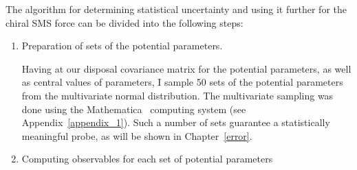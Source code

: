 The algorithm for determining statistical uncertainty and using it further for the chiral SMS force can be divided into the following steps:
\begin{enumerate}
\item Preparation of sets of the potential parameters.

Having at our disposal covariance matrix for the potential parameters, as well as central values of parameters, I sample 50 sets of the potential parameters from the multivariate normal distribution. The multivariate sampling was done using the Mathematica\textsuperscript{\textregistered}~\cite{Mathematica11p3} computing system (see Appendix~\ref{appendix_1}). Such a number of sets guarantee a statistically meaningful probe, as will be shown in Chapter~\ref{error}. 
%
\item Computing observables for each set of potential parameters


\end{enumerate}
